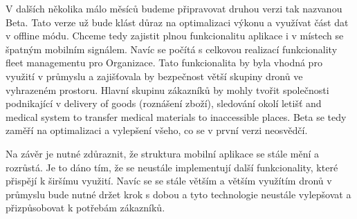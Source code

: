 V dalších několika málo měsíců budeme připravovat druhou verzi tak nazvanou Beta.
Tato verze už bude klást důraz na optimalizaci výkonu a využívat část dat v offline módu.
Chceme tedy zajistit plnou funkcionalitu aplikace i v místech se špatným mobilním signálem.
Navíc se počítá s celkovou realizací funkcionality fleet managementu pro Organizace.
Tato funkcionalita by byla vhodná pro využití v průmyslu a zajišťovala by bezpečnost větší skupiny dronů ve vyhrazeném prostoru.
Hlavní skupinu zákazníků by mohly tvořit společnosti podnikající v delivery of goods (roznášení zboží), sledování okolí letišť and medical system to transfer medical materials to inaccessible places.
Beta se tedy zaměří na optimalizaci a vylepšení všeho, co se v první verzi neosvědčí.

Na závěr je nutné zdůraznit, že struktura mobilní aplikace se stále mění a rozrůstá.
Je to dáno tím, že se neustále implementují další funkcionality, které přispějí k širšímu využití.
Navíc se se stále větším a větším využítím dronů v průmyslu bude nutné držet krok s dobou a tyto technologie neustále vylepšovat a přizpůsobovat k potřebám zákazníků.

